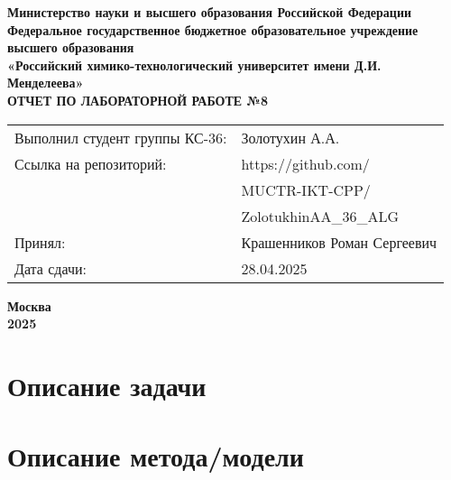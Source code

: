 \documentclass[12pt, a4paper]{report}
\begin{document}
	\begin{titlepage}
		\begin{center}
			\large \textbf{Министерство науки и высшего образования Российской Федерации} \\
			\large \textbf{Федеральное государственное бюджетное образовательное учреждение высшего образования} \\
			\large \textbf{«Российский химико-технологический университет имени Д.И. Менделеева»} \\

			\vspace*{4cm}
			\LARGE \textbf{ОТЧЕТ ПО ЛАБОРАТОРНОЙ РАБОТЕ №8}

			\vspace*{4cm}
			\begin{flushright}
				\Large
				\begin{tabular}{>{\raggedleft\arraybackslash}p{9cm} p{10cm}}
					Выполнил студент группы КС-36: & Золотухин А.А. \\
					Ссылка на репозиторий: & https://github.com/ \\
					& MUCTR-IKT-CPP/ \\
					& ZolotukhinAA\_36\_ALG \\
					Принял: & Крашенников Роман Сергеевич \\
					Дата сдачи: & 28.04.2025 \\
				\end{tabular}
			\end{flushright}

			\vspace*{6cm}
			\Large \textbf{Москва \\ 2025}
		\end{center}
	\end{titlepage}

	\tableofcontents
	\thispagestyle{empty}
	\newpage


	\section*{Описание задачи}
	\large

	\newpage

	\section*{Описание метода/модели}
	\large
\end{document}
